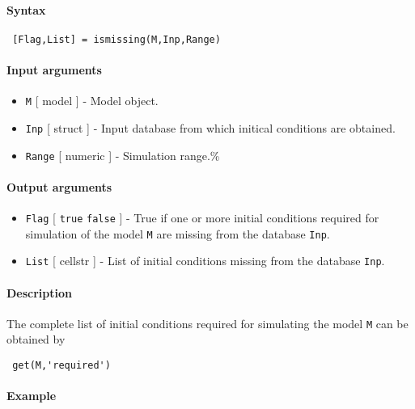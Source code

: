 


	\paragraph{Syntax}
 
 \begin{verbatim}
 [Flag,List] = ismissing(M,Inp,Range)
 \end{verbatim}
 
 \paragraph{Input arguments}
 
 \begin{itemize}
 \item
   \texttt{M} {[} model {]} - Model object.
 \item
   \texttt{Inp} {[} struct {]} - Input database from which initical
   conditions are obtained.
 \item
   \texttt{Range} {[} numeric {]} - Simulation range.\%
 \end{itemize}
 
 \paragraph{Output arguments}
 
 \begin{itemize}
 \item
   \texttt{Flag} {[} \texttt{true} \textbar{} \texttt{false} {]} - True
   if one or more initial conditions required for simulation of the model
   \texttt{M} are missing from the database \texttt{Inp}.
 \item
   \texttt{List} {[} cellstr {]} - List of initial conditions missing
   from the database \texttt{Inp}.
 \end{itemize}
 
 \paragraph{Description}
 
 The complete list of initial conditions required for simulating the
 model \texttt{M} can be obtained by
 
 \begin{verbatim}
 get(M,'required')
 \end{verbatim}
 
 \paragraph{Example}


